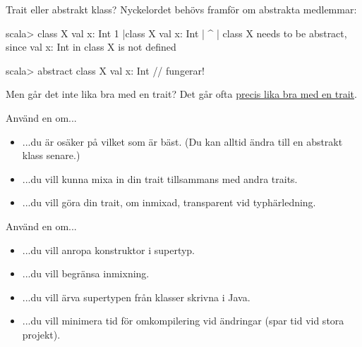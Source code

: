 
\begin{Slide}{Trait eller abstrakt klass?}\SlideFontSmall
Nyckelordet  behövs framför  om abstrakta medlemmar:
\begin{REPLsmall}
scala> class X { val x: Int }
1 |class X { val x: Int }
  |      ^
  |      class X needs to be abstract, since val x: Int in class X is not defined 

scala> abstract class X { val x: Int }  // fungerar!
\end{REPLsmall}  
Men går det inte lika bra med en trait? \pause Det går ofta \href{https://youtu.be/aFmIS5qeetA?t=221}{precis lika bra med en trait}.%
\label{slideW07:traitorclass}%
\begin{multicols}{2}
\noindent Använd en  om...
\begin{itemize}
\item ...du är osäker på vilket som är bäst. (Du kan alltid ändra till en abstrakt klass senare.)
\item ...du vill kunna mixa in din trait tillsammans med andra traits.
\item ...du vill göra din trait, om inmixad, transparent vid typhärledning.

\end{itemize}

\columnbreak

\noindent Använd en  om...
\begin{itemize}
\item ...du vill anropa konstruktor i supertyp.
\item ...du vill begränsa inmixning. 
\item ...du vill ärva supertypen från klasser skrivna i Java.
\item ...du vill minimera tid för omkompilering vid ändringar (spar tid vid stora projekt).
\end{itemize}
\end{multicols}
\end{Slide}

